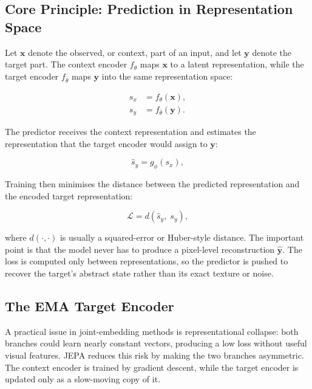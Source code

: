 \documentclass[12pt,a4paper]{article}
\begin{document}
\subsection{Core Principle: Prediction in Representation Space}
\label{subsec:jepa-core}

Let $\mathbf{x}$ denote the observed, or context, part of an input, and let
$\mathbf{y}$ denote the target part. The context encoder $f_\theta$ maps
$\mathbf{x}$ to a latent representation, while the target encoder
$f_{\bar\theta}$ maps $\mathbf{y}$ into the same representation space:

\begin{align}
  s_x &= f_\theta(\mathbf{x}),  \label{eq:enc-ctx} \\
  s_y &= f_{\bar\theta}(\mathbf{y}).  \label{eq:enc-tgt}
\end{align}

The predictor receives the context representation and estimates the
representation that the target encoder would assign to $\mathbf{y}$:

\begin{equation}
  \hat{s}_y = g_\phi(s_x), \label{eq:predictor}
\end{equation}

Training then minimises the distance between the predicted representation and
the encoded target representation:

\begin{equation}
  \mathcal{L} = d\!\left(\hat{s}_y,\; s_y\right), \label{eq:loss}
\end{equation}

where $d(\cdot,\cdot)$ is usually a squared-error or Huber-style distance. The
important point is that the model never has to produce a pixel-level
reconstruction $\hat{\mathbf{y}}$. The loss is computed only between
representations, so the predictor is pushed to recover the target's abstract
state rather than its exact texture or noise.

\subsection{The EMA Target Encoder}
\label{subsec:jepa-collapse}

A practical issue in joint-embedding methods is representational collapse: both
branches could learn nearly constant vectors, producing a low loss without
useful visual features. JEPA reduces this risk by making the two branches
asymmetric. The context encoder is trained by gradient descent, while the
target encoder is updated only as a slow-moving copy of it.
\end{document}
